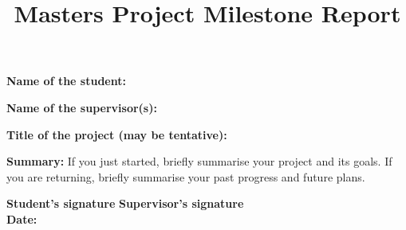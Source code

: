\documentclass[12pt]{amsart}
\title{Masters Project Milestone Report}
\begin{document}
\maketitle

\thispagestyle{empty}

\noindent
\textbf{Name of the student:}
\vspace{1em}

\noindent
\textbf{Name of the supervisor(s):}
\vspace{2em}

\noindent
\textbf{Title of the project (may be tentative):}
\vspace{3em}

\noindent
\textbf{Summary:} If you just started, briefly summarise your project and its goals.
If you are returning, briefly summarise your past progress and future plans.

\vfill

\noindent
\textbf{Student's signature} \hfill \textbf{Supervisor's signature} \hspace{10em} \mbox{}\\

\noindent
\textbf{Date:}
\end{document}

